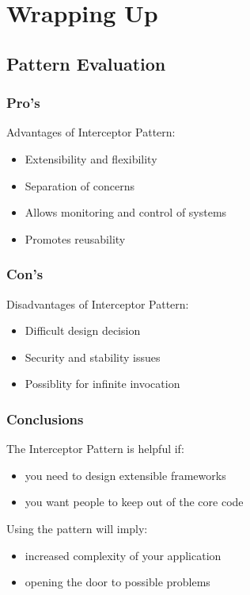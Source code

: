 \documentclass{beamer}
\begin{document}
\section{Wrapping Up}

\subsection{Pattern Evaluation}

\begin{frame}
  \frametitle{Pro's}

  Advantages of Interceptor Pattern:
  \begin{itemize}
  \item Extensibility and flexibility
  \item Separation of concerns
  \item Allows monitoring and control of systems
  \item Promotes reusability
  \end{itemize}

\end{frame}

\begin{frame}
  \frametitle{Con's}

  Disadvantages of Interceptor Pattern:
  \begin{itemize}
  \item Difficult design decision
  \item Security and stability issues
  \item Possiblity for infinite invocation
  \end{itemize}

\end{frame}

\begin{frame}
  \frametitle{Conclusions}

  \begin{block}{The Interceptor Pattern is helpful if:}
  \begin{itemize}
  \item you need to design extensible frameworks
  \item you want people to keep out of the core code
  \end{itemize}
  \end{block}

  \pause

  \begin{block}{Using the pattern will imply:}
  \begin{itemize}
  \item increased complexity of your application
  \item opening the door to possible problems
  \end{itemize}
  \end{block}

\end{frame}
\end{document}
